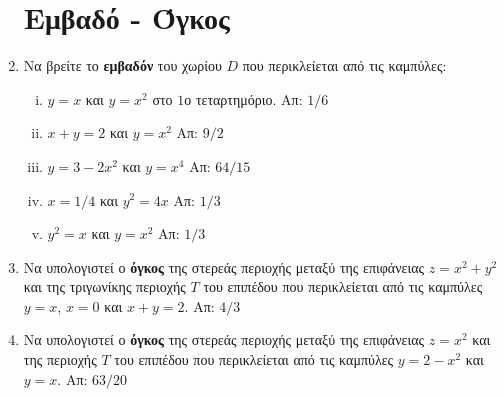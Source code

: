 \begin{enumerate}
    \section*{Εμβαδό - Όγκος}

  \item Να βρείτε το \textbf{εμβαδόν} του χωρίου $D$ που περικλείεται από τις καμπύλες: 
    \begin{enumerate}[i)]
      \item $y=x$ και $y=x^2$ στο $1$ο τεταρτημόριο. \hfill Απ: ${1}/{6}$
      \item $x+y=2$ και $y=x^2$ \hfill Απ: ${9}/{2}$
      \item $y=3-2x^2$ και $y=x^4$ \hfill Απ: ${64}/{15}$
      \item $x={1}/{4}$ και $y^2=4x$ \hfill Απ: ${1}/{3}$ %
      \item $y^2=x$ και $y=x^2$ \hfill Απ: ${1}/{3}$ %
    \end{enumerate}

  \item Να υπολογιστεί ο \textbf{όγκος} της στερεάς περιοχής μεταξύ της επιφάνειας 
    $ z=x^{2}+y^{2} $ και της τριγωνίκης περιοχής $T$ του επιπέδου που περικλείεται από 
    τις καμπύλες $ y= x $, $x=0$ και $ x+y=2 $.
    \hfill Απ: $ 4/3 $  

  \item Να υπολογιστεί ο \textbf{όγκος} της στερεάς περιοχής μεταξύ της επιφάνειας 
    $ z=x^{2} $ και της περιοχής $T$ του επιπέδου που περικλείεται από 
    τις καμπύλες $ y= 2-x^{2} $  και $y=x$.
    \hfill Απ: $ 63/20 $ 

\end{enumerate}

\vspace{\baselineskip}

\begin{center}
  \minibox{\large\bf \textcolor{Col1}{Υποδείξεις}}
\end{center}

\vspace{\baselineskip}

